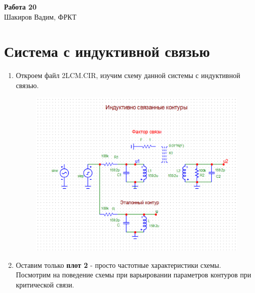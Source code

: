 \documentclass[a4paper, 14pt]{article}%
\begin{document}
\begin{titlepage}

\begin{center}
\vfill
\huge\textbf{Работа 20}\\
\vspace*{1cm}
\large Шакиров Вадим, ФРКТ\\
\vfill
\end{center}

\end{titlepage}

\section{Система с индуктивной связью}

\begin{enumerate}

\item Откроем файл 2LCM.CIR, изучим схему данной системы с индуктивной связью.

\begin{figure}[h!]
\centering
\includegraphics[scale = 0.7]{images/2LCM.png}
\label{fig:Image1}
\end{figure}

\newpage

\item Оставим только \textbf{плот 2} - просто частотные характеристики схемы. Посмотрим на поведение схемы при варьировании параметров контуров при критической связи.


\end{enumerate}
\end{document}
